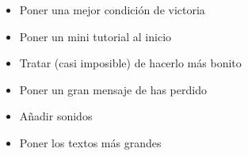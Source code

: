 \documentclass{article}
\begin{document}
\begin{itemize}
    \item Poner una mejor condición de victoria
    \item Poner un mini tutorial al inicio
    \item Tratar (casi imposible) de hacerlo más bonito
    \item Poner un gran mensaje de has perdido
    \item Añadir sonidos
    \item Poner los textos más grandes
\end{itemize}
\end{document}
